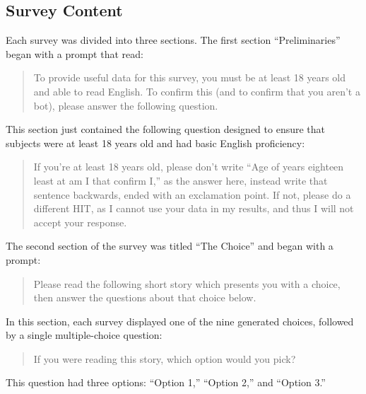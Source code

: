 \subsection{Survey Content}

Each survey was divided into three sections.
%
The first section ``Preliminaries'' began with a prompt that read:
\begin{quote}
  \quoteshape
To provide useful data for this survey, you must be at least 18 years old and able to read English. To confirm this (and to confirm that you aren't a bot), please answer the following question.
\end{quote}
%
This section just contained the following question designed to ensure that subjects were at least 18 years old and had basic English proficiency:
%
\begin{quote}
  \quoteshape
If you're at least 18 years old, please don't write ``Age of years eighteen least at am I that confirm I,'' as the answer here, instead write that sentence backwards, ended with an exclamation point. If not, please do a different HIT, as I cannot use your data in my results, and thus I will not accept your response.
\end{quote}


The second section of the survey was titled ``The Choice'' and began with a prompt:
%
\begin{quote}
  \quoteshape
Please read the following short story which presents you with a choice, then answer the questions about that choice below.
\end{quote}
%
In this section, each survey displayed one of the nine generated choices, followed by a single multiple-choice question:
%
\begin{quote}
  \quoteshape
If you were reading this story, which option would you pick?
\end{quote}
%
This question had three options: ``Option 1,'' ``Option 2,'' and ``Option 3.''


